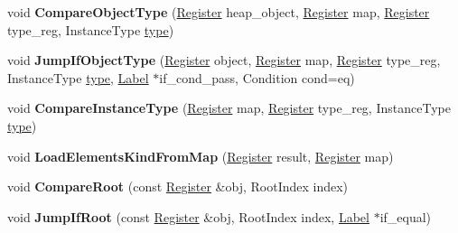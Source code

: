 \begin{DoxyCompactItemize}
void {\bfseries Compare\+Object\+Type} (\mbox{\hyperlink{classv8_1_1internal_1_1Register}{Register}} heap\+\_\+object, \mbox{\hyperlink{classv8_1_1internal_1_1Register}{Register}} map, \mbox{\hyperlink{classv8_1_1internal_1_1Register}{Register}} type\+\_\+reg, Instance\+Type \mbox{\hyperlink{classstd_1_1conditional_1_1type}{type}})
\item 
\mbox{\label{classv8_1_1internal_1_1MacroAssembler_a4c5f8dd0b8c94889099046a26dd33370}} 
void {\bfseries Jump\+If\+Object\+Type} (\mbox{\hyperlink{classv8_1_1internal_1_1Register}{Register}} object, \mbox{\hyperlink{classv8_1_1internal_1_1Register}{Register}} map, \mbox{\hyperlink{classv8_1_1internal_1_1Register}{Register}} type\+\_\+reg, Instance\+Type \mbox{\hyperlink{classstd_1_1conditional_1_1type}{type}}, \mbox{\hyperlink{classv8_1_1internal_1_1Label}{Label}} $\ast$if\+\_\+cond\+\_\+pass, Condition cond=eq)
\item 
\mbox{\label{classv8_1_1internal_1_1MacroAssembler_a18c4f37a00c2903da694afa03f600688}} 
void {\bfseries Compare\+Instance\+Type} (\mbox{\hyperlink{classv8_1_1internal_1_1Register}{Register}} map, \mbox{\hyperlink{classv8_1_1internal_1_1Register}{Register}} type\+\_\+reg, Instance\+Type \mbox{\hyperlink{classstd_1_1conditional_1_1type}{type}})
\item 
\mbox{\label{classv8_1_1internal_1_1MacroAssembler_ad5babf87fb2e0e718d563f43a3aca79b}} 
void {\bfseries Load\+Elements\+Kind\+From\+Map} (\mbox{\hyperlink{classv8_1_1internal_1_1Register}{Register}} result, \mbox{\hyperlink{classv8_1_1internal_1_1Register}{Register}} map)
\item 
\mbox{\label{classv8_1_1internal_1_1MacroAssembler_ae33af93062d0881cbdc641ddbd2fdc87}} 
void {\bfseries Compare\+Root} (const \mbox{\hyperlink{classv8_1_1internal_1_1Register}{Register}} \&obj, Root\+Index index)
\item 
\mbox{\label{classv8_1_1internal_1_1MacroAssembler_abd4665d343e9dc0e824c83fe84f4c9dd}} 
void {\bfseries Jump\+If\+Root} (const \mbox{\hyperlink{classv8_1_1internal_1_1Register}{Register}} \&obj, Root\+Index index, \mbox{\hyperlink{classv8_1_1internal_1_1Label}{Label}} $\ast$if\+\_\+equal)

\end{DoxyCompactItemize}
